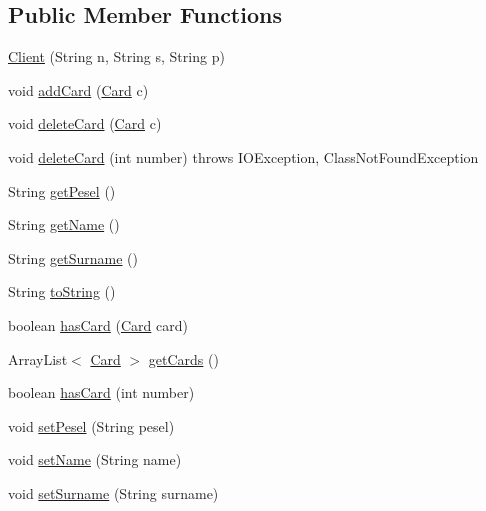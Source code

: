 \subsection*{Public Member Functions}
\begin{DoxyCompactItemize}
\item 
\mbox{\hyperlink{classmodules_1_1_client_a50a7497cb32369672791ba33ace3264a}{Client}} (String n, String s, String p)
\item 
void \mbox{\hyperlink{classmodules_1_1_client_af9336218314937dc1a6820e84300b2bf}{add\+Card}} (\mbox{\hyperlink{classmodules_1_1bank_1_1_card}{Card}} c)
\item 
void \mbox{\hyperlink{classmodules_1_1_client_adc18605a931558c2483d48bf2cf36b0b}{delete\+Card}} (\mbox{\hyperlink{classmodules_1_1bank_1_1_card}{Card}} c)
\item 
void \mbox{\hyperlink{classmodules_1_1_client_a4fd4fe0ecb40203d81addd411abd18df}{delete\+Card}} (int number)  throws I\+O\+Exception, Class\+Not\+Found\+Exception 
\item 
String \mbox{\hyperlink{classmodules_1_1_client_abf135a1873bab2a59572e5208faa6b93}{get\+Pesel}} ()
\item 
String \mbox{\hyperlink{classmodules_1_1_client_afec5499055f7177339a5ff45bbcfff10}{get\+Name}} ()
\item 
String \mbox{\hyperlink{classmodules_1_1_client_a9edde75585aa9be7aebb9a9b818c6e12}{get\+Surname}} ()
\item 
String \mbox{\hyperlink{classmodules_1_1_client_a9ed6710e3598afe3dda7dac426c495fe}{to\+String}} ()
\item 
boolean \mbox{\hyperlink{classmodules_1_1_client_aa2b00842b4607600838347f2410c97ec}{has\+Card}} (\mbox{\hyperlink{classmodules_1_1bank_1_1_card}{Card}} card)
\item 
Array\+List$<$ \mbox{\hyperlink{classmodules_1_1bank_1_1_card}{Card}} $>$ \mbox{\hyperlink{classmodules_1_1_client_a4b56c055f3afc28546ea29b9579f79a1}{get\+Cards}} ()
\item 
boolean \mbox{\hyperlink{classmodules_1_1_client_a85eedfbdd0cdde608d7ce84aeb215e52}{has\+Card}} (int number)
\item 
void \mbox{\hyperlink{classmodules_1_1_client_acaea2a8b2086e298e3b22b86c409ecf4}{set\+Pesel}} (String pesel)
\item 
void \mbox{\hyperlink{classmodules_1_1_client_ae4fbf557127b160ce3de90af49bc3ff9}{set\+Name}} (String name)
\item 
void \mbox{\hyperlink{classmodules_1_1_client_a06f2d345b05093b2d61ca6cfc1f406a1}{set\+Surname}} (String surname)
\end{DoxyCompactItemize}


